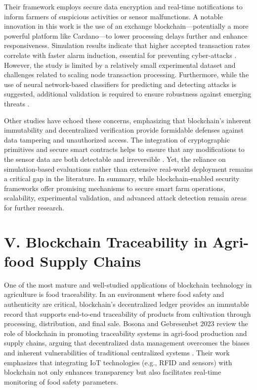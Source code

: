 \documentclass[12pt,onecolumn]{IEEEtran} %
\begin{document}
Their framework employs secure data encryption and real-time notifications to inform farmers of suspicious activities or sensor malfunctions. A notable innovation in this work is the use of an exchange blockchain---potentially a more powerful platform like Cardano---to lower processing delays further and enhance responsiveness. Simulation results indicate that higher accepted transaction rates correlate with faster alarm induction, essential for preventing cyber-attacks \cite{aliyu2023blockchainbasedsmartfarm}. However, the study is limited by a relatively small experimental dataset and challenges related to scaling node transaction processing. Furthermore, while the use of neural network-based classifiers for predicting and detecting attacks is suggested, additional validation is required to ensure robustness against emerging threats \cite{aliyu2023blockchainbasedsmartfarm}.

Other studies have echoed these concerns, emphasizing that blockchain's inherent immutability and decentralized verification provide formidable defenses against data tampering and unauthorized access. The integration of cryptographic primitives and secure smart contracts helps to ensure that any modifications to the sensor data are both detectable and irreversible \cite{aliyu2023blockchainbasedsmartfarm, demestichas2020blockchaininagriculture}. Yet, the reliance on simulation-based evaluations rather than extensive real-world deployment remains a critical gap in the literature. In summary, while blockchain-enabled security frameworks offer promising mechanisms to secure smart farm operations, scalability, experimental validation, and advanced attack detection remain areas for further research.

\section*{V. Blockchain Traceability in Agri-food Supply Chains}

One of the most mature and well-studied applications of blockchain technology in agriculture is food traceability. In an environment where food safety and authenticity are critical, blockchain's decentralized ledger provides an immutable record that supports end-to-end traceability of products from cultivation through processing, distribution, and final sale. Bosona and Gebresenbet 2023 review the role of blockchain in promoting traceability systems in agri-food production and supply chains, arguing that decentralized data management overcomes the biases and inherent vulnerabilities of traditional centralized systems \cite{bosona2023theroleof}. Their work emphasizes that integrating IoT technologies (e.g., RFID and sensors) with blockchain not only enhances transparency but also facilitates real-time monitoring of food safety parameters.
\end{document}
